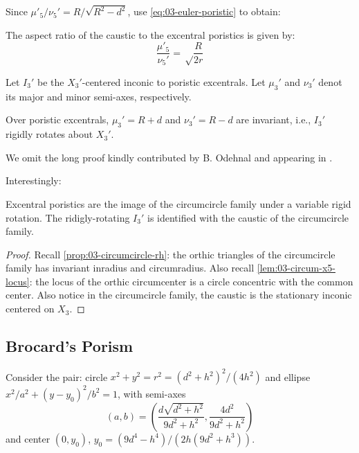 Since $\mu'_5/\nu_5'=R/\sqrt{R^2-d^2}$, use \cref{eq:03-euler-poristic} to obtain:

\begin{corollary}
The aspect ratio of the caustic to the excentral poristics is given by:
\begin{equation*}
 \frac{\mu'_5}{\nu_5'}={\sqrt\frac{R}{2 r}}
\end{equation*}
\end{corollary}

Let $I_3'$ be the $X_3'$-centered inconic to poristic excentrals. Let $\mu_3'$ and $\nu_3'$ denot its major and minor semi-axes, respectively.

\begin{proposition}
Over poristic excentrals,  $\mu_3'=R+d$ and $\nu_3'=R-d$ are invariant, i.e., $I_3'$ rigidly rotates about $X_3'$.
\label{prop:03-inconic-x3p}
\end{proposition}

We omit the long proof kindly contributed by B. Odehnal and appearing in \cite[Appendix C]{garcia2020-similarity-I}.

Interestingly:

\begin{theorem}
Excentral poristics are the image of the circumcircle family under a variable rigid rotation. The ridigly-rotating $I_3'$ is identified with the caustic of the circumcircle family.
\end{theorem} 

\begin{proof}
Recall \cref{prop:03-circumcircle-rh}: the orthic triangles of the circumcircle family has invariant inradius and circumradius. Also recall \cref{lem:03-circum-x5-locus}: the locus of the orthic circumcenter is a circle concentric with the common center. Also notice in the circumcircle family, the caustic is the stationary inconic centered on $X_3$.
\end{proof}

 \subsection{Brocard's Porism}

Consider the pair: circle $x^2+y^2=r^2=(d^2+h^2)^2/(4h^2)$ and   ellipse
$x^2/a^2+(y-y_0)^2/b^2=1$, with  semi-axes
 \[  (a,b)=\left(\frac{d\sqrt{d^2+h^2}}{9d^2+h^2},\frac{4d^2}{9d^2+h^2}\right)
    \]
and center $(0,y_0)$,  $y_0=(9d^4 - h^4)/(2h(9d^2  +  h^3))$.
 

